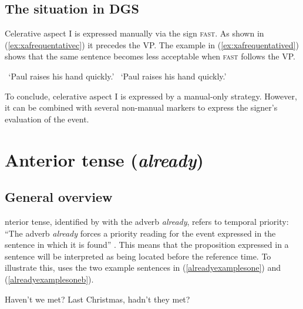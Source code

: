 \subsection{The situation in DGS}

Celerative aspect I is expressed manually via the sign \textsc{fast}. As shown in (\ref{ex:xafrequentativec}) it precedes the VP. The example in (\ref{ex:xafrequentatived}) shows that the same sentence becomes less acceptable when \textsc{fast} follows the VP. 

\begin{exe}
\ex\begin{xlist} 
\glt \textcolor{white}{?}`Paul raises his hand quickly.' \label{ex:xafrequentativec}
\glt \textcolor{white}{?}`Paul raises his hand quickly.'  \label{ex:xafrequentatived}
\end{xlist}
\end{exe} 

\noindent To conclude, celerative aspect I is expressed by a manual-only strategy. However, it can be combined with several non-manual markers to express the signer's evaluation of the event. 

\section{Anterior tense (\textit{already})}
\subsection{General overview}
nterior tense, identified by \citet[94]{cinque1999adverbs} with the adverb \textit{already}, refers to temporal priority: ``The adverb \textit{already} forces a priority reading for the event expressed in the sentence in which it is found'' \citep[547]{hornstein1977towards}. This means that the proposition expressed in a sentence will be interpreted as being located before the reference time. To illustrate this, \citet[94]{cinque1999adverbs} uses the two example sentences in (\ref{alreadyexamplesone}) and (\ref{alreadyexamplesoneb}).

\begin{exe}
\ex\label{alreadyexamplesone}\begin{xlist} 
\ex Haven't we met? \label{alreadyexampleaa}
\ex Last Christmas, hadn't they met? \label{alreadyexampleab}
\end{xlist}
\end{exe} 

